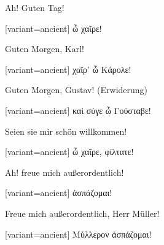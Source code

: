 \indent Ah! Guten Tag!

\switchcolumn

\begin{greek}[variant=ancient]%
ὦ χαῖρε!

\end{greek}%
\switchcolumn*

Guten Morgen, Karl!

\switchcolumn

\begin{greek}[variant=ancient]%
χαῖρ' ὦ Κάρολε!

\end{greek}%
\switchcolumn*

Guten Morgen, Gustav! (Erwiderung)

\switchcolumn

\begin{greek}[variant=ancient]%
καὶ σύγε ὦ Γούσταβε!

\end{greek}%
\switchcolumn*

Seien sie mir schön willkommen!

\switchcolumn

\begin{greek}[variant=ancient]%
ὦ χαῖρε, φίλτατε!

\end{greek}%
\switchcolumn*

Ah! freue mich außerordentlich!

\switchcolumn

\begin{greek}[variant=ancient]%
ἀσπάζομαι!

\end{greek}%
\switchcolumn*

Freue mich außerordentlich, Herr Müller!

\switchcolumn

\begin{greek}[variant=ancient]%
Μύλλερον ἀσπάζομαι!

\end{greek}%
\switchcolumn*

